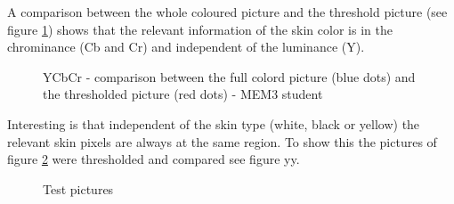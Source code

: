 \documentclass[Bachelorarbeit.tex]{subfiles}
\begin{document}
\medskip
A comparison between the whole coloured picture and the threshold picture (see figure \ref{comparisonOfThresholding}) shows that the relevant information of the skin color is in the chrominance (Cb and Cr) and independent of the luminance (Y).

\begin{figure}[!h]
\centering
{}
\caption[YCbCr - comparison - full colored and thresholded]{YCbCr - comparison between the full colord picture (blue dots) and the thresholded picture (red dots) - MEM3 student}\label{comparisonOfThresholding}
\end{figure}

\medskip
Interesting is that independent of the skin type (white, black or yellow) the relevant skin pixels are always at the same region. To show this the pictures of figure \ref{testPictures} were thresholded and compared see figure yy.

\begin{figure}[!h]
\centering
{}
\caption{Test pictures}\label{testPictures}
\end{figure}
\end{document}
